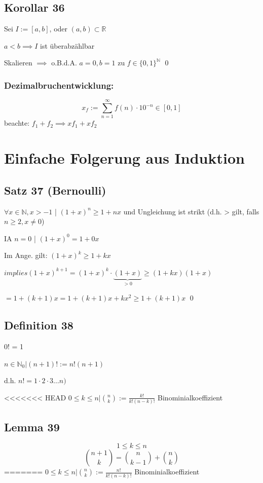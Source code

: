\documentclass[fleqn]{scrbook}
\newcommand{\R}{\mathbb{R}}
\newcommand{\N}{\mathbb{N}}
\renewenvironment{proof}{{\bfseries Beweis }}{\qed}
\begin{document}
\subsection{Korollar 36} Sei $I := [a,b]$, oder $(a,b) \subset \R$

$a < b \implies I$ ist überabzählbar

\begin{proof}
Skalieren $\implies$ o.B.d.A. $a = 0, b = 1$ zu $f \in \{0,1\}^\N$
\end{proof}
\subsubsection{Dezimalbruchentwicklung:} \[x_f := \sum_{n = 1}^\infty f(n)  \cdot  10^{-n} \in [0,1]\]
beachte: $f_1 + f_2 \implies xf_1 + xf_2$
\section{Einfache Folgerung aus Induktion}
\subsection{Satz 37 (Bernoulli)}
$\forall x \in \N, x > -1$ | $(1+x)^n \geq 1 + nx$ und Ungleichung ist strikt (d.h. > gilt, falls $n \geq 2, x \neq 0$)

\begin{proof}
	IA $n = 0$ | $(1 + x)^0 = 1 + 0x$
	
	Im Ange. gilt: $(1 + x)^k \geq 1 + k x$
	
	$implies (1 + x)^{k + 1} = (1 + x)^k  \cdot  \underbrace{(1 + x)}_{> 0} \geq (1 + kx) (1 + x)$
	
	$= 1 + (k + 1)x = 1 + (k + 1)x + k x^2 \geq 1 + (k + 1)x$
\end{proof}
\subsection{Definition 38} 0! = 1

	$n \in \N_0 | (n + 1)! := n!(n+1)$
	
	d.h. $n! = 1  \cdot  2  \cdot  3 \ldots n)$
	
<<<<<<< HEAD
	$0 \leq k \leq n | \binom{n}{k} := \frac{k!}{k!(n-k)!}$ Binominialkoeffizient
\subsection{Lemma 39} \[1 \leq k \leq n\] \[\binom{n+1}{k} = \binom {n}{k-1} + \binom{n}{k}\]
=======
	$0 \leq k \leq n | \binom{n}{k} := \frac{n!}{k!(n-k)!}$ Binominialkoeffizient
\end{document}
